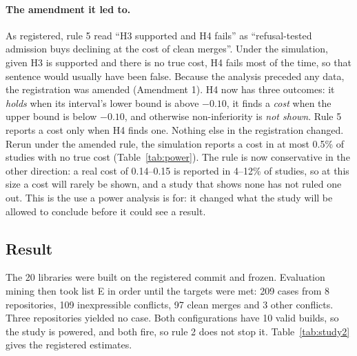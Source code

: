 \documentclass[11pt]{article}
\begin{document}
\paragraph{The amendment it led to.}
As registered, rule 5 read ``H3 supported and H4 fails'' as ``refusal-tested admission buys
declining at the cost of clean merges''. Under the simulation, given H3 is supported and there is
no true cost, H4 fails most of the time, so that sentence would usually have been false. Because
the analysis preceded any data, the registration was amended (Amendment 1). H4 now has three
outcomes: it \emph{holds} when its interval's lower bound is above $-0.10$, it finds a
\emph{cost} when the upper bound is below $-0.10$, and otherwise non-inferiority is \emph{not
shown}. Rule 5 reports a cost only when H4 finds one. Nothing else in the registration changed.
Rerun under the amended rule, the simulation reports a cost in at most 0.5\% of studies with no
true cost (Table~\ref{tab:power}). The rule is now conservative in the other direction: a real
cost of 0.14--0.15 is reported in 4--12\% of studies, so at this size a cost will rarely be shown,
and a study that shows none has not ruled one out.
This is the use a power analysis is for: it changed what the study will be allowed to conclude
before it could see a result.

\subsection{Result}
\label{sec:study2result}

The 20 libraries were built on the registered commit and frozen. Evaluation mining then took list
E in order until the targets were met: 209 cases from 8 repositories, 109 inexpressible conflicts,
97 clean merges and 3 other conflicts. Three repositories yielded no case. Both configurations
have 10 valid builds, so the study is powered, and both fire, so rule 2 does not stop it.
Table~\ref{tab:study2} gives the registered estimates.

\begin{table}[t]
\centering
\caption{Study 2 as registered (\S 9 rules 3--5). $f$ is the fire rate on the 109 inexpressible
conflicts; lower is better, since nothing is right on them. Intervals are the registered two-level
bootstrap.}
\label{tab:study2}
\small

\end{table}
\end{document}
